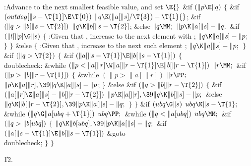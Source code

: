 \B{}:Advance  to the next smallest feasible value, and set %
\X${}\E{}$\6
\&{if} ${}(\|p\E\|q){}$\5
${}\{{}$\1\6
\&{if} ${}(\\{outdeg}[\|s-\T{1}]\E\T{0}){}$\1\5
${}\|q\K(\|a[\|s]/\T{3})+\T{1}{}$;\2\6
\&{if} ${}(\|q>\|b[\|s-\T{2}]){}$\1\5
${}\|q\K\|b[\|s-\T{2}]{}$;\5
\2\&{else}\1\5
${}\|q\MM;{}$\2\6
${}\|p\K\|a[\|s]-\|q;{}$\6
\&{if} ${}(\|l[\|p]\G\|s){}$\5
${}\{{}$\1\6
:Given that , increase  to the next element
with \X;\6
${}\|q\K\|a[\|s]-\|p;{}$\6
\4${}\}{}$\2\6
\4${}\}{}$\5
\2\&{else}\5
${}\{{}$\1\6
:Given that , increase  to the next such element%
\X;\6
${}\|q\K\|a[\|s]-\|p;{}$\6
\4${}\}{}$\2\6
\&{if} ${}(\|q>\T{2}){}$\5
${}\{{}$\1\6
\&{if} ${}(\|a[\|s-\T{1}]\E\|b[\|s-\T{1}]){}$\5
${}\{{}$\1\6
\4\\{doublecheck}:\5
\&{while} ${}(\|p<\|a[\|r]\W\|a[\|r-\T{1}]\E\|b[\|r-\T{1}]){}$\1\5
${}\|r\MM;{}$\2\6
\&{if} ${}(\|p>\|b[\|r-\T{1}]){}$\5
${}\{{}$\1\6
\&{while} ${}(\|p>\|a[\|r]){}$\1\5
${}\|r\PP;{}$\2\6
${}\|p\K\|a[\|r],\39\|q\K\|a[\|s]-\|p{}$;\6
\4${}\}{}$\5
\2\&{else} \&{if} ${}(\|q>\|b[\|r-\T{2}]){}$\5
${}\{{}$\1\6
\&{if} ${}(\|a[\|r]\Z\|a[\|s]-\|b[\|r-\T{2}]){}$\1\5
${}\|p\K\|a[\|r],\39\|q\K\|b[\|s]-\|p;{}$\2\6
\&{else}\1\5
${}\|q\K\|b[\|r-\T{2}],\39\|p\K\|a[\|s]-\|q;{}$\2\6
\4${}\}{}$\2\6
\4${}\}{}$\2\6
\&{if} ${}(\\{ubq}\G\|s){}$\1\5
${}\\{ubq}\K\|s-\T{1};{}$\2\6
\&{while} ${}(\|q\G\|a[\\{ubq}+\T{1}]){}$\1\5
${}\\{ubq}\PP;{}$\2\6
\&{while} ${}(\|q<\|a[\\{ubq}]){}$\1\5
${}\\{ubq}\MM;{}$\2\6
\&{if} ${}(\|q>\|b[\\{ubq}]){}$\5
${}\{{}$\1\6
${}\|q\K\|b[\\{ubq}],\39\|p\K\|a[\|s]-\|q;{}$\6
\&{if} ${}(\|a[\|s-\T{1}]\E\|b[\|s-\T{1}]){}$\1\5
\&{goto} \\{doublecheck};\2\6
\4${}\}{}$\2\6
\4${}\}{}$\2\par
\U12.\fi

